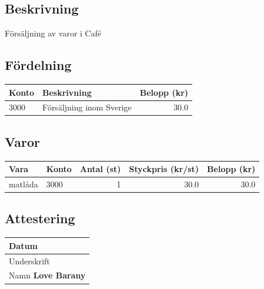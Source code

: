 \documentclass{article}
\newcommand{\namn}{Love Barany}
\newcommand{\beskrivning}{Försäljning av varor i Café}\newcommand{\fordelning}{3000 & Försäljning inom Sverige & 30.0\\}\newcommand{\varor}{matlåda & 3000 & 1 & 30.0 & 30.0\\}
\begin{document}
    \subsection*{Beskrivning}
    \beskrivning

    \subsection*{Fördelning}
    \begin{tabular}{p{0.6in}p{2in}r}
        Konto & Beskrivning& Belopp (kr)\\ \hline
        \fordelning
    \end{tabular}

    \subsection*{Varor}
    \begin{longtable}[l]{llrrr}
        Vara & Konto & Antal (st) & Styckpris (kr/st) & Belopp (kr) \\ \hline
        \varor
    \end{longtable}

    \subsection*{Attestering}
    \begin{tabular}{|p{2.5in}|}
        \hline
        {\footnotesize Datum} \newline \\
        \hline
        {\footnotesize Underskrift} \newline \newline\\
        \hline
        {\footnotesize Namn} \newline \textbf{\namn} \\
        \hline
    \end{tabular}
    
\end{document}
